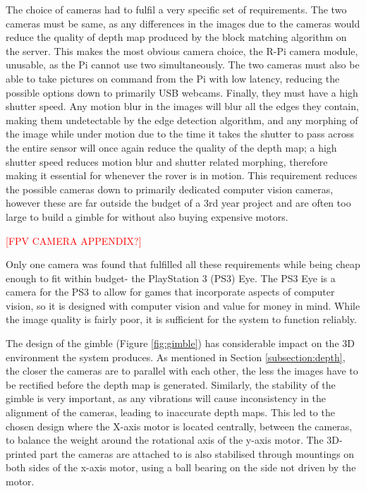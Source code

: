 The choice of cameras had to fulfil a very specific set of requirements. The two cameras must be same, as any differences in the images due to the cameras would reduce the quality of depth map produced by the block matching algorithm on the server. This makes the most obvious camera choice, the R-Pi camera module, unusable, as the Pi cannot use two simultaneously. The two cameras must also be able to take pictures on command from the Pi with low latency, reducing the possible options down to primarily USB webcams. Finally, they must have a high shutter speed. Any motion blur in the images will blur all the edges they contain, making them undetectable by the edge detection algorithm, and any morphing of the image while under motion due to the time it takes the shutter to pass across the entire sensor will once again reduce the quality of the depth map; a high shutter speed reduces motion blur and shutter related morphing, therefore making it essential for whenever the rover is in motion. This requirement reduces the possible cameras down to primarily dedicated computer vision cameras, however these are far outside the budget of a 3rd year project and are often too large to build a gimble for without also buying expensive motors.

\textcolor{red}{[FPV CAMERA APPENDIX?]}

Only one camera was found that fulfilled all these requirements while being cheap enough to fit within budget- the PlayStation 3 (PS3) Eye. The PS3 Eye is a camera for the PS3 to allow for games that incorporate aspects of computer vision, so it is designed with computer vision and value for money in mind. While the image quality is fairly poor, it is sufficient for the system to function reliably. 

The design of the gimble (Figure \ref{fig:gimble}) has considerable impact on the 3D environment the system produces. As mentioned in Section \ref{subsection:depth}, the closer the cameras are to parallel with each other, the less the images have to be rectified before the depth map is generated. Similarly, the stability of the gimble is very important, as any vibrations will cause inconsistency in the alignment of the cameras, leading to inaccurate depth maps. This led to the chosen design where the X-axis motor is located centrally, between the cameras, to balance the weight around the rotational axis of the y-axis motor. The 3D-printed part the cameras are attached to is also stabilised through mountings on both sides of the x-axis motor, using a ball bearing on the side not driven by the motor. 

